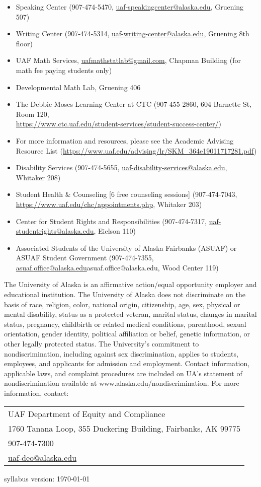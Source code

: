 \documentclass[12pt]{article}
\def\mailto#1{\href{mailto:#1}{#1}}
\begin{document}
\begin{itemize}
\setlength\itemsep{0em}
        \item Speaking Center (907-474-5470,
        \mailto{uaf-speakingcenter@alaska.edu}, Gruening 507)
\item Writing Center (907-474-5314, \mailto{uaf-writing-center@alaska.edu}, Gruening 8th floor)
\item UAF Math Services, \mailto{uafmathstatlab@gmail.com}, Chapman Building (for math fee paying students only)
\item Developmental Math Lab, Gruening 406
\item The Debbie Moses Learning Center at CTC (907-455-2860, 604 Barnette St, Room 120,\\ \mailto{https://www.ctc.uaf.edu/student-services/student-success-center/})
\item For more information and resources, please see the Academic Advising Resource List (\url{https://www.uaf.edu/advising/lr/SKM_364e19011717281.pdf})
\end{itemize}

\begin{itemize}
\setlength\itemsep{0em}
\item Disability Services (907-474-5655, \mailto{uaf-disability-services@alaska.edu}, Whitaker 208)
\item Student Health \& Counseling [6 free counseling sessions] (907-474-7043, \url{https://www.uaf.edu/chc/appointments.php}, Whitaker 203)
\item Center for Student Rights and Responsibilities (907-474-7317, \mailto{uaf-studentrights@alaska.edu}, Eielson 110)
\item Associated Students of the University of Alaska Fairbanks (ASUAF) or ASUAF Student Government (907-474-7355, \mailto{asuaf.office@alaska.edu}{asuaf.office@alaska.edu}, Wood Center 119)
\end{itemize}

The University of Alaska is an affirmative action/equal opportunity employer and educational institution. The University of Alaska does not discriminate on the basis of race, religion, color, national origin, citizenship, age, sex, physical or mental disability, status as a protected veteran, marital status, changes in marital status, pregnancy, childbirth or related medical conditions, parenthood, sexual orientation, gender identity, political affiliation or belief, genetic information, or other legally protected status. The University's commitment to nondiscrimination, including against sex discrimination, applies to students, employees, and applicants for admission and employment. Contact information, applicable laws, and complaint procedures are included on UA's statement of nondiscrimination available at www.alaska.edu/nondiscrimination. For more information, contact:

\begin{tabular}{l}
UAF Department of Equity and Compliance\\
1760 Tanana Loop, 355 Duckering Building, Fairbanks, AK  99775\\
907-474-7300\\
\mailto{uaf-deo@alaska.edu}
\end{tabular}

\hfill

 \scriptsize syllabus version: \today \normalsize
\end{document}
